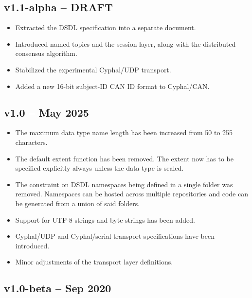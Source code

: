 \subsection{v1.1-alpha -- DRAFT}

\begin{itemize}
    \item Extracted the DSDL specification into a separate document.
    \item Introduced named topics and the session layer, along with the distributed consensus algorithm.
    \item Stabilized the experimental Cyphal/UDP transport.
    \item Added a new 16-bit subject-ID CAN ID format to Cyphal/CAN.
\end{itemize}

\subsection{v1.0 -- May 2025}

\begin{itemize}
    \item The maximum data type name length has been increased from 50 to 255 characters.

    \item The default extent function has been removed.
    The extent now has to be specified explicitly always unless the data type is sealed.

    \item The constraint on DSDL namespaces being defined in a single folder was removed. Namespaces can be hosted
    across multiple repositories and code can be generated from a union of said folders.

    \item Support for UTF-8 strings and byte strings has been added.

    \item Cyphal/UDP and Cyphal/serial transport specifications have been introduced.

    \item Minor adjustments of the transport layer definitions.
\end{itemize}

\subsection{v1.0-beta -- Sep 2020}

